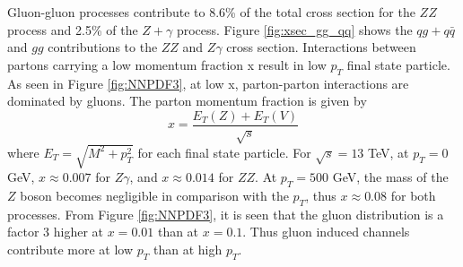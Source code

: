 \documentclass[12pt,a4paper,openright,twoside]{report}
\begin{document}
Gluon-gluon processes contribute to 8.6\% of the total cross section for the $ZZ$ process and 2.5\% of the $Z+\gamma$ process. Figure \ref{fig:xsec_gg_qq} shows the $qg+q\bar{q}$ and $gg$ contributions to the $ZZ$ and $Z\gamma$ cross section. Interactions between partons carrying a low momentum fraction x result in low $p_T$ final state particle. As seen in Figure \ref{fig:NNPDF3}, at low x, parton-parton interactions are dominated by gluons. The parton momentum fraction is given by 
$$
x = \frac{E_T(Z)+E_T(V)}{\sqrt{s}}
$$
where $E_T = \sqrt{M^2 + p_T^2}$ for each final state particle. For $\sqrt{s}=13$ TeV, at $p_T = 0$ GeV, $x \approx 0.007$ for $Z\gamma$, and $x \approx 0.014$ for $ZZ$. At $p_T = 500$ GeV, the mass of the $Z$ boson becomes negligible in comparison with the $p_T$, thus $x \approx 0.08$ for both processes. From Figure \ref{fig:NNPDF3}, it is seen that the gluon distribution is a factor 3 higher at $x=0.01$ than at $x=0.1$.
Thus gluon induced channels contribute more at low $p_T$ than at high $p_T$.
\end{document}
